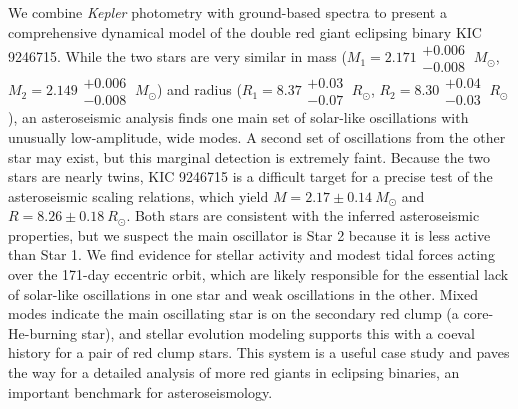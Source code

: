 We combine \emph{Kepler} photometry with ground-based spectra to present a comprehensive dynamical model of the double red giant eclipsing binary KIC 9246715. While the two stars are very similar in mass ($M_1 = 2.171\substack{+0.006 \\ -0.008} \ M_{\odot}$, $M_2 = 2.149\substack{+0.006 \\ -0.008} \ M_{\odot}$) and radius ($R_1 = 8.37\substack{+0.03 \\ -0.07} \ R_{\odot}$, $R_2 = 8.30\substack{+0.04 \\ -0.03} \ R_{\odot}$), an asteroseismic analysis finds one main set of solar-like oscillations with unusually low-amplitude, wide modes. A second set of oscillations from the other star may exist, but this marginal detection is extremely faint. Because the two stars are nearly twins, KIC 9246715 is a difficult target for a precise test of the asteroseismic scaling relations, which yield $M = 2.17\pm0.14 \ M_{\odot}$ and $R = 8.26\pm0.18 \ R_{\odot}$. Both stars are consistent with the inferred asteroseismic properties, but we suspect the main oscillator is Star 2 because it is less active than Star 1. We find evidence for stellar activity and modest tidal forces acting over the 171-day eccentric orbit, which are likely responsible for the essential lack of solar-like oscillations in one star and weak oscillations in the other. Mixed modes indicate the main oscillating star is on the secondary red clump (a core-He-burning star), and stellar evolution modeling supports this with a coeval history for a pair of red clump stars. This system is a useful case study and paves the way for a detailed analysis of more red giants in eclipsing binaries, an important benchmark for asteroseismology.
  